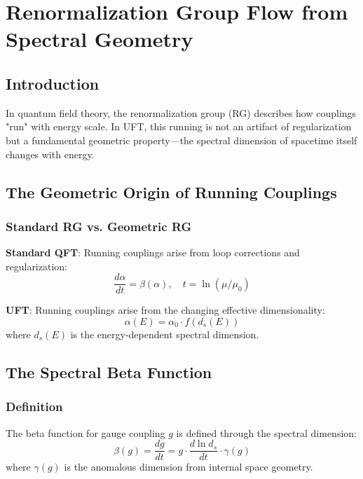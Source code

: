 \section{Renormalization Group Flow from Spectral Geometry}
\label{sec:rg_flow_geometric}

\subsection{Introduction}

In quantum field theory, the renormalization group (RG) describes how couplings "run" with energy scale. In UFT, this running is not an artifact of regularization but a fundamental geometric property—the spectral dimension of spacetime itself changes with energy.

\subsection{The Geometric Origin of Running Couplings}

\subsubsection{Standard RG vs. Geometric RG}

\textbf{Standard QFT}: Running couplings arise from loop corrections and regularization:
\begin{equation}
    \frac{d\alpha}{dt} = \beta(\alpha), \quad t = \ln(\mu/\mu_0)
\end{equation}

\textbf{UFT}: Running couplings arise from the changing effective dimensionality:
\begin{equation}
    \alpha(E) = \alpha_0 \cdot f(d_s(E))
\end{equation}
where $d_s(E)$ is the energy-dependent spectral dimension.

\subsection{The Spectral Beta Function}

\subsubsection{Definition}

\begin{definition}
The beta function for gauge coupling $g$ is defined through the spectral dimension:
\begin{equation}
    \beta(g) = \frac{dg}{dt} = g \cdot \frac{d \ln d_s}{dt} \cdot \gamma(g)
\end{equation}
where $\gamma(g)$ is the anomalous dimension from internal space geometry.
\end{definition}

